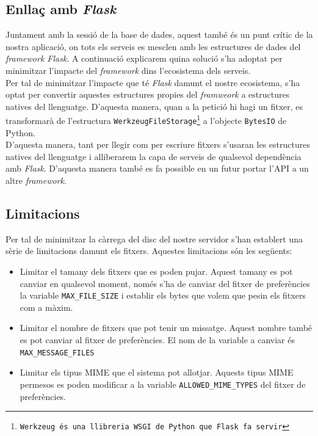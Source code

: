 \subsection{Enllaç amb \emph{Flask}}
Juntament amb la sessió de la base de dades, aquest també és un punt crític de la nostra aplicació, on tots els serveis es mesclen amb les estructures de dades del \emph{framework Flask}. A continuació explicarem quina solució s'ha adoptat per minimitzar l'impacte del \emph{framework} dins l'ecosistema dels serveis.\\

Per tal de minimitzar l'impacte que té \emph{Flask} damunt el nostre ecosistema, s'ha optat per convertir aquestes estructures propies del \emph{framweork} a estructures natives del llenguatge. D'aquesta manera, quan a la petició hi hagi un fitxer, es transformarà de l'estructura \texttt{WerkzeugFileStorage\footnote{Werkzeug és una llibreria WSGI de Python que Flask fa servir}} a l'objecte \texttt{BytesIO} de Python.\\

D'aquesta manera, tant per llegir com per escriure fitxers s'usaran les estructures natives del llenguatge i alliberarem la capa de serveis de qualsevol dependència amb \emph{Flask}. D'aquesta manera també es fa possible en un futur portar l'\ac{API} a un altre \emph{framework}. 

\subsection{Limitacions}
Per tal de minimitzar la càrrega del disc del nostre servidor s'han establert una sèrie de limitacions damunt els fitxers. Aquestes limitacions són les següents:

\begin{itemize}
	\item Limitar el tamany dels fitxers que es poden pujar. Aquest tamany es pot canviar en qualsevol moment, només s'ha de canviar del fitxer de preferències la variable \verb$MAX_FILE_SIZE$ i establir els bytes que volem que pesin els fitxers com a màxim.
	\item Limitar el nombre de fitxers que pot tenir un missatge. Aquest nombre també es pot canviar al fitxer de preferències. El nom de la variable a canviar és \verb$MAX_MESSAGE_FILES$
	\item Limitar els tipus \ac{MIME} que el sistema pot allotjar. Aquests tipus \ac{MIME} permesos es poden modificar a la variable \verb$ALLOWED_MIME_TYPES$ del fitxer de preferències.
\end{itemize}
	
